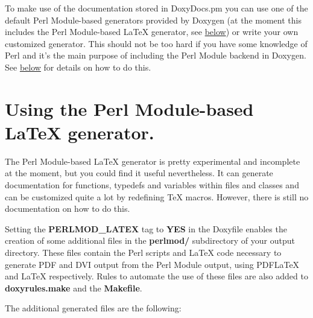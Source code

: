 To make use of the documentation stored in DoxyDocs.pm you can use one of the default Perl Module-based generators provided by Doxygen (at the moment this includes the Perl Module-based LaTeX generator, see \hyperlink{perlmod_perlmod_latex}{below}) or write your own customized generator. This should not be too hard if you have some knowledge of Perl and it's the main purpose of including the Perl Module backend in Doxygen. See \hyperlink{perlmod_doxydocs_format}{below} for details on how to do this.\hypertarget{perlmod_perlmod_latex}{}\section{Using the Perl Module-based LaTeX generator.}\label{perlmod_perlmod_latex}
The Perl Module-based LaTeX generator is pretty experimental and incomplete at the moment, but you could find it useful nevertheless. It can generate documentation for functions, typedefs and variables within files and classes and can be customized quite a lot by redefining TeX macros. However, there is still no documentation on how to do this.

Setting the {\bf PERLMOD\_\-LATEX} tag to {\bf YES} in the Doxyfile enables the creation of some additional files in the {\bf perlmod/} subdirectory of your output directory. These files contain the Perl scripts and LaTeX code necessary to generate PDF and DVI output from the Perl Module output, using PDFLaTeX and LaTeX respectively. Rules to automate the use of these files are also added to {\bf doxyrules.make} and the {\bf Makefile}.

The additional generated files are the following:

